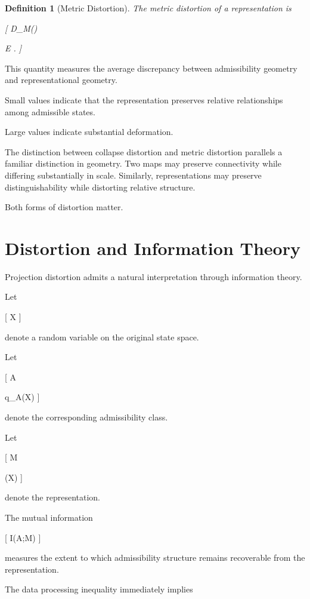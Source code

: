 \documentclass[11pt,oneside,openany]{book}
\newtheorem{definition}{Definition}[chapter] \newtheorem{theorem}{Theorem}[chapter] \newtheorem{proposition}{Proposition}[chapter] \newtheorem{lemma}{Lemma}[chapter] \newtheorem{corollary}{Corollary}[chapter] \newtheorem{remark}{Remark}[chapter]
\begin{document}
\begin{definition}[Metric Distortion]

The metric distortion of a representation is

[
D_M(\pi)

\mathbb E
.
]

\end{definition}

This quantity measures the average discrepancy between admissibility geometry and representational geometry.

Small values indicate that the representation preserves relative relationships among admissible states.

Large values indicate substantial deformation.

The distinction between collapse distortion and metric distortion parallels a familiar distinction in geometry. Two maps may preserve connectivity while differing substantially in scale. Similarly, representations may preserve distinguishability while distorting relative structure.

Both forms of distortion matter.

\section{Distortion and Information Theory}

Projection distortion admits a natural interpretation through information theory.

Let

[
X
]

denote a random variable on the original state space.

Let

[
A

q_A(X)
]

denote the corresponding admissibility class.

Let

[
M

\pi(X)
]

denote the representation.

The mutual information

[
I(A;M)
]

measures the extent to which admissibility structure remains recoverable from the representation.

The data processing inequality immediately implies
\end{document}
